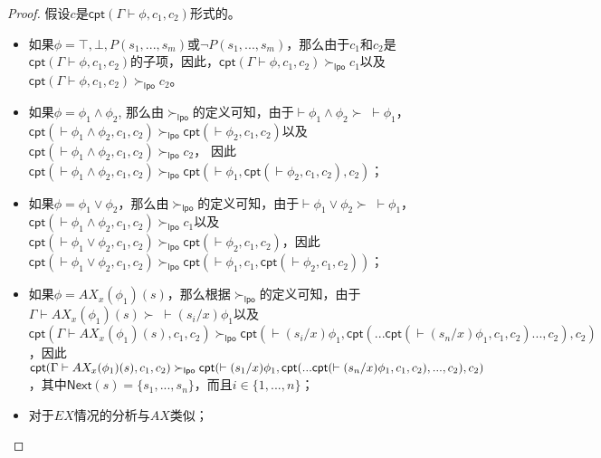 \begin{proof}
	假设$c$是$\textsf{cpt}(\Gamma\vdash\phi,c_1,c_2)$形式的。
	\begin{itemize}
		\item 如果$\phi= \top, \bot,  P(s_1,...,s_m)$或$\neg P(s_1,...,s_m)$，那么由于$c_1$和$c_2$是$\textsf{cpt}(\Gamma\vdash\phi,c_1, c_2)$的子项，因此，$\textsf{cpt}(\Gamma\vdash\phi,c_1, c_2) \succ_{\mathsf{lpo}} c_1$以及$\textsf{cpt}(\Gamma\vdash\phi,c_1, c_2) \succ_{\mathsf{lpo}} c_2$。
		\item 如果$\phi = \phi_1\wedge\phi_2$, 那么由$\succ_{\mathsf{lpo}}$的定义可知，由于$\vdash\phi_1\wedge\phi_2 \succ \;\vdash\phi_1$， $\textsf{cpt}(\vdash\phi_1\wedge\phi_2, c_1, c_2)\succ_{\mathsf{lpo}} \textsf{cpt}(\vdash\phi_2, c_1, c_2)$以及 $\textsf{cpt}(\vdash\phi_1\wedge\phi_2, c_1, c_2)\succ_{\mathsf{lpo}} c_2$， 因此$\textsf{cpt}(\vdash\phi_1\wedge\phi_2, c_1, c_2)\succ_{\mathsf{lpo}} \textsf{cpt}(\vdash\phi_1, \textsf{cpt}(\vdash\phi_2, c_1, c_2), c_2)$；
		\item 如果$\phi = \phi_1\vee\phi_2$，那么由$\succ_{\mathsf{lpo}}$的定义可知，由于$\vdash\phi_1\vee\phi_2 \succ \;\vdash\phi_1$， $\textsf{cpt}(\vdash\phi_1\wedge\phi_2, c_1, c_2)\succ_{\mathsf{lpo}} c_1$以及$\textsf{cpt}(\vdash\phi_1\vee\phi_2, c_1, c_2)\succ_{\mathsf{lpo}} \textsf{cpt}(\vdash\phi_2, c_1, c_2)$，因此 $\textsf{cpt}(\vdash\phi_1\vee\phi_2, c_1, c_2)\succ_{\mathsf{lpo}} \textsf{cpt}(\vdash\phi_1, c_1, \textsf{cpt}(\vdash\phi_2, c_1, c_2))$；
		\item 如果$\phi =AX_x(\phi_1)(s)$，那么根据$\succ_{\mathsf{lpo}}$的定义可知，由于$\Gamma\vdash AX_x(\phi_1)(s)\succ\; \vdash(s_i/x)\phi_1$以及 $\textsf{cpt}(\Gamma\vdash AX_x(\phi_1)(s), c_1, c_2)\succ_{\mathsf{lpo}} \textsf{cpt}(\vdash(s_i/x)\phi_1, \textsf{cpt}(...\textsf{cpt}(\vdash(s_n/x)\phi_1, c_1, c_2)..., c_2), c_2)$，因此$\textsf{cpt}(\Gamma\vdash AX_x(\phi_1)(s), c_1, c_2) \succ_{\mathsf{lpo}} \textsf{cpt}(\vdash(s_1/x)\phi_1,\\ \textsf{cpt}(...\textsf{cpt}(\vdash(s_n/x)\phi_1, c_1, c_2),...,c_2), c_2)$，其中$\textsf{Next}(s)=\{s_1,...,s_n\}$，而且$i\in\{1,...,n\}$；
		\item 对于$EX$情况的分析与$AX$类似；

\end{itemize}
\end{proof}
